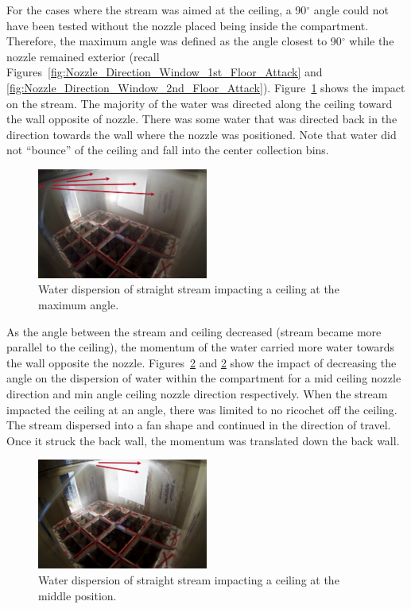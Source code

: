 \documentclass[12pt,oneside]{book}
\begin{document}
For the cases where the stream was aimed at the ceiling, a 90$^{\circ}$ angle could not have been tested without the nozzle placed being inside the compartment. Therefore, the maximum angle was defined as the angle closest to 90$^{\circ}$ while the nozzle remained exterior (recall Figures~\ref{fig:Nozzle_Direction_Window_1st_Floor_Attack} and \ref{fig:Nozzle_Direction_Window_2nd_Floor_Attack}). Figure~\ref{fig:MaxAngleCeilingImpact} shows the impact on the stream. The majority of the water was directed along the ceiling toward the wall opposite of nozzle. There was some water that was directed back in the direction towards the wall where the nozzle was positioned. Note that water did not ``bounce'' of the ceiling and fall into the center collection bins.

\begin{figure}[!ht]
\centering
\includegraphics[width=0.5\textwidth]{Figures/Water_Distribution/Nozzle_Directions/Exterior_MaxAngleCeiling_SS_Arrows} 
\caption[Water Dispersion Straight Stream Max Angle Ceiling]{Water dispersion of straight stream impacting a ceiling at the maximum angle.}
\label{fig:MaxAngleCeilingImpact}
\end{figure}

As the angle between the stream and ceiling decreased (stream became more parallel to the ceiling), the momentum of the water carried more water towards the wall opposite the nozzle. Figures~\ref{fig:MidCeilingImpact} and \ref{fig:MidCeilingImpact} show the impact of decreasing the angle on the dispersion of water within the compartment for a mid ceiling nozzle direction and min angle ceiling nozzle direction respectively. When the stream impacted the ceiling at an angle, there was limited to no ricochet off the ceiling. The stream dispersed into a fan shape and continued in the direction of travel. Once it struck the back wall, the momentum was translated down the back wall. 

\begin{figure}[!ht]
\centering
\includegraphics[width=0.5\textwidth]{Figures/Water_Distribution/Nozzle_Directions/Exterior_MidCeiling_SS_Arrows}
\caption[Water Dispersion Straight Stream Middle Position Ceiling]{Water dispersion of straight stream impacting a ceiling at the middle position.}
\label{fig:MidCeilingImpact}
\end{figure}
\end{document}
